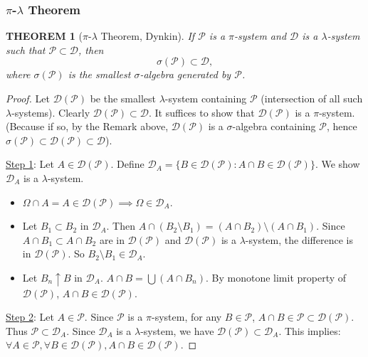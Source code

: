 \documentclass[12pt]{article}
\theoremstyle{blueplain}
\newtheorem{theorem}{THEOREM}[section]
\theoremstyle{bluedef}
\theoremstyle{blueremark}
\numberwithin{equation}{section}
\begin{document}
\subsubsection{$\pi$-$\lambda$ Theorem}

\begin{theorem}[$\pi$-$\lambda$ Theorem, Dynkin]
  If $\mathcal{P}$ is a $\pi$-system and $\mathcal{D}$ is a $\lambda$-system such that $\mathcal{P} \subset \mathcal{D}$, then
  \[ \sigma(\mathcal{P}) \subset \mathcal{D}, \]
  where $\sigma(\mathcal{P})$ is the smallest $\sigma$-algebra generated by $\mathcal{P}$.
\end{theorem}

\begin{proof}
  Let $\mathcal{D}(\mathcal{P})$ be the smallest $\lambda$-system containing $\mathcal{P}$ (intersection of all such $\lambda$-systems). Clearly $\mathcal{D}(\mathcal{P}) \subset \mathcal{D}$.
  It suffices to show that $\mathcal{D}(\mathcal{P})$ is a $\pi$-system. (Because if so, by the Remark above, $\mathcal{D}(\mathcal{P})$ is a $\sigma$-algebra containing $\mathcal{P}$, hence $\sigma(\mathcal{P}) \subset \mathcal{D}(\mathcal{P}) \subset \mathcal{D}$).

  \underline{Step 1}: Let $A \in \mathcal{D}(\mathcal{P})$. Define $\mathcal{D}_A = \{ B \in \mathcal{D}(\mathcal{P}) : A \cap B \in \mathcal{D}(\mathcal{P}) \}$.
  We show $\mathcal{D}_A$ is a $\lambda$-system.
  \begin{itemize}
    \item $\Omega \cap A = A \in \mathcal{D}(\mathcal{P}) \implies \Omega \in \mathcal{D}_A$.
    \item Let $B_1 \subset B_2$ in $\mathcal{D}_A$. Then $A \cap (B_2 \setminus B_1) = (A \cap B_2) \setminus (A \cap B_1)$. Since $A \cap B_1 \subset A \cap B_2$ are in $\mathcal{D}(\mathcal{P})$ and $\mathcal{D}(\mathcal{P})$ is a $\lambda$-system, the difference is in $\mathcal{D}(\mathcal{P})$. So $B_2 \setminus B_1 \in \mathcal{D}_A$.
    \item Let $B_n \uparrow B$ in $\mathcal{D}_A$. $A \cap B = \bigcup (A \cap B_n)$. By monotone limit property of $\mathcal{D}(\mathcal{P})$, $A \cap B \in \mathcal{D}(\mathcal{P})$.
  \end{itemize}

  \underline{Step 2}: Let $A \in \mathcal{P}$. Since $\mathcal{P}$ is a $\pi$-system, for any $B \in \mathcal{P}$, $A \cap B \in \mathcal{P} \subset \mathcal{D}(\mathcal{P})$. Thus $\mathcal{P} \subset \mathcal{D}_A$.
  Since $\mathcal{D}_A$ is a $\lambda$-system, we have $\mathcal{D}(\mathcal{P}) \subset \mathcal{D}_A$.
  This implies: $\forall A \in \mathcal{P}, \forall B \in \mathcal{D}(\mathcal{P}), A \cap B \in \mathcal{D}(\mathcal{P})$.


\end{proof}
\end{document}
